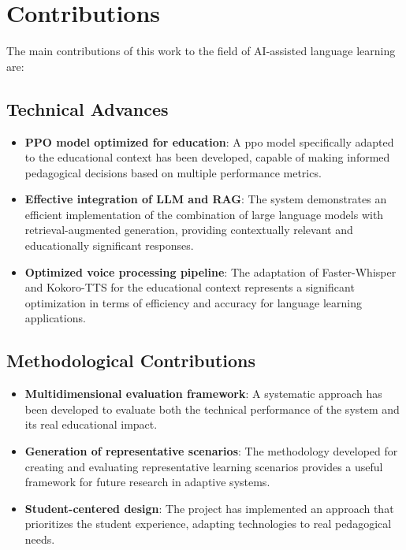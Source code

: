 \section{Contributions}
\label{sec:contributions}

The main contributions of this work to the field of AI-assisted language learning are:

\subsection{Technical Advances}
\label{subsec:technical-advances}

\begin{itemize}
    \item \textbf{PPO model optimized for education}: A \gls{ppo} model specifically adapted to the educational context has been developed, capable of making informed pedagogical decisions based on multiple performance metrics.
    
    \item \textbf{Effective integration of LLM and RAG}: The system demonstrates an efficient implementation of the combination of large language models with retrieval-augmented generation, providing contextually relevant and educationally significant responses.
    
    \item \textbf{Optimized voice processing pipeline}: The adaptation of Faster-Whisper and Kokoro-TTS for the educational context represents a significant optimization in terms of efficiency and accuracy for language learning applications.
\end{itemize}

\subsection{Methodological Contributions}
\label{subsec:methodological-contributions}

\begin{itemize}
    \item \textbf{Multidimensional evaluation framework}: A systematic approach has been developed to evaluate both the technical performance of the system and its real educational impact.
    
    \item \textbf{Generation of representative scenarios}: The methodology developed for creating and evaluating representative learning scenarios provides a useful framework for future research in adaptive systems.
    
    \item \textbf{Student-centered design}: The project has implemented an approach that prioritizes the student experience, adapting technologies to real pedagogical needs.
\end{itemize}

